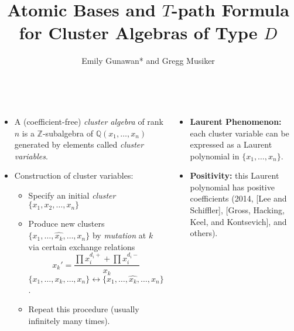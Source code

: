 \documentclass[a0paper, portrait, 17pt]{tikzposter}
\title{Atomic Bases and $T$-path Formula for Cluster Algebras of Type $D$} \author{Emily Gunawan* and Gregg Musiker}
\institute{University of Minnesota, Minneapolis, USA}
\begin{document}
 \maketitle
\begin{columns}


 {
\begin{itemize}

\item A (coefficient-free) \emph{cluster algebra}  of rank $n$  is a $\mathbb{Z}$-subalgebra of $\mathbb{Q}(x_1, \dots, x_n)$
generated by elements called \emph{cluster variables}.

\item Construction of cluster variables:
\begin{itemize}
\item Specify an initial \emph{cluster}
$\{ x_1, x_2, \dots, x_n\}$ %

\item Produce new clusters $\{ x_1,  \dots, \hat{x_k}, \dots, x_n\}$ by \emph{mutation} at $k$
via certain exchange relations
$$ x_k' = \frac{\prod x_i^{d_i+} + \prod x_i^{d_i-}} { x_k }$$
$\{ x_1, \dots, {x_k}, \dots, x_n\} \longleftrightarrow \{ x_1, \dots, \hat{x_k}, \dots, x_n\}$. 

\item Repeat this procedure (usually infinitely many times).
\end{itemize}
\end{itemize}

    \begin{itemize}
    \item \textbf{Laurent Phenomenon:} each cluster variable can be expressed as a Laurent polynomial in $\{ x_1, \dots, x_n\}$.
    \item \textbf{Positivity:} this Laurent polynomial has positive coefficients (2014, [Lee and Schiffler], [Gross, Hacking, Keel, and Kontsevich], and others).
    \end{itemize}
}


\end{columns}
\end{document}
